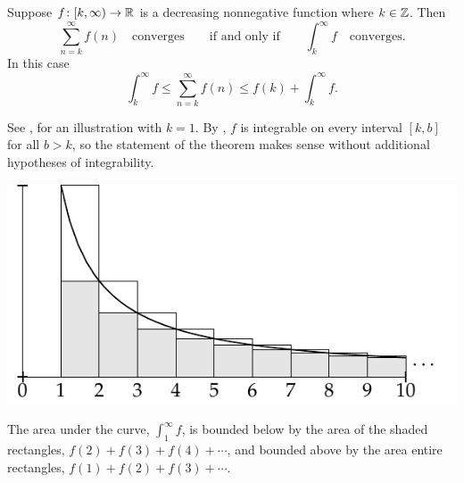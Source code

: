 \begin{prop}
Suppose $f \colon [k,\infty) \to {\mathbb{R}}$ is a decreasing nonnegative
function where $k \in {\mathbb{Z}}$.  Then
\begin{equation*}
\sum_{n=k}^\infty f(n)
\quad \text{converges} \qquad \text{if and only if}
\qquad
\int_k^\infty f
\quad \text{converges}.
\end{equation*}
In this case 
\begin{equation*}
\int_k^\infty f
\leq
\sum_{n=k}^\infty f(n)
\leq
f(k)+
\int_k^\infty f .
\end{equation*}
\end{prop}
See , for an illustration with $k=1$.
By ,
$f$ is integrable
on every interval $[k,b]$ for all $b > k$, so the statement of the theorem
makes sense without additional hypotheses of integrability.
\begin{myfigureht}
\includegraphics{figures/integraltest}
\caption{The area under the curve, 
$\int_1^\infty f$, is bounded below
by the area of the shaded rectangles,
$f(2)+f(3)+f(4)+\cdots$, and bounded above
by the area entire rectangles,
$f(1)+f(2)+f(3)+\cdots$.\label{fig:integraltest}}
\end{myfigureht}

